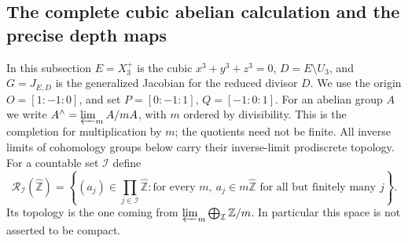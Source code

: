 \subsection{The complete cubic abelian calculation and the precise depth maps}

In this subsection $E=X_3^+$ is the cubic
$x^3+y^3+z^3=0$, $D=E\setminus U_3$, and
$G=J_{E,D}$ is the generalized Jacobian for the reduced divisor $D$.
We use the origin $O=[1:-1:0]$, and set
$P=[0:-1:1]$, $Q=[-1:0:1]$.
For an abelian group $A$ we write
$A^\wedge=\varprojlim_m A/mA$, with $m$ ordered by divisibility.
This is the completion for multiplication by $m$; the quotients
need not be finite. All inverse limits of cohomology groups below
carry their inverse-limit prodiscrete topology.
For a countable set $\mathcal I$ define
\[
 \mathcal R_{\mathcal I}(\widehat{\mathbb Z})
 =\left\{(a_j)\in\prod_{j\in\mathcal I}\widehat{\mathbb Z}:
       \text{for every }m,\ a_j\in m\widehat{\mathbb Z}
       \text{ for all but finitely many }j\right\}.
\]
Its topology is the one coming from
$\varprojlim_m\bigoplus_{\mathcal I}\mathbb Z/m$.
In particular this space is not asserted to be compact.

